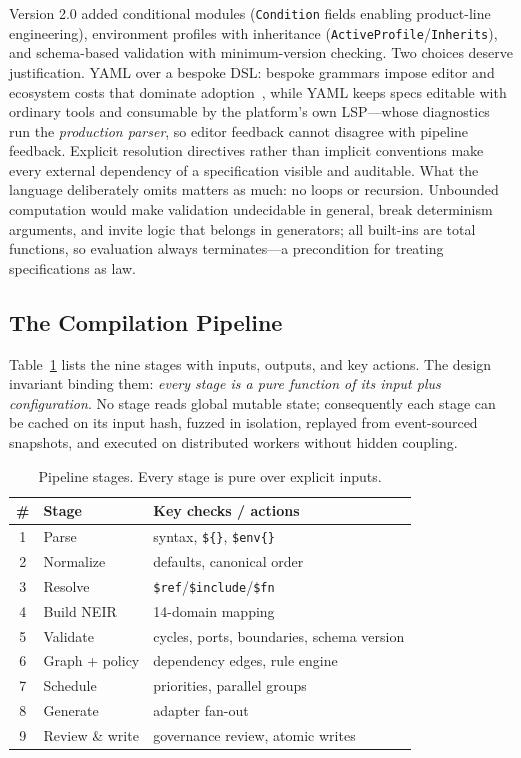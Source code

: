 \documentclass[sigconf,nonacm]{acmart}
\begin{document}
Version 2.0 added conditional modules (\texttt{Condition} fields enabling product-line engineering), environment profiles with inheritance (\texttt{ActiveProfile}/\texttt{Inherits}), and schema-based validation with minimum-version checking. Two choices deserve justification. YAML over a bespoke DSL: bespoke grammars impose editor and ecosystem costs that dominate adoption~\cite{mernik2005dsl}, while YAML keeps specs editable with ordinary tools and consumable by the platform's own LSP---whose diagnostics run the \emph{production parser}, so editor feedback cannot disagree with pipeline feedback. Explicit resolution directives rather than implicit conventions make every external dependency of a specification visible and auditable. What the language deliberately omits matters as much: no loops or recursion. Unbounded computation would make validation undecidable in general, break determinism arguments, and invite logic that belongs in generators; all built-ins are total functions, so evaluation always terminates---a precondition for treating specifications as law.

\subsection{The Compilation Pipeline}
\label{sec:pipeline}
Table~\ref{tab:stages} lists the nine stages with inputs, outputs, and key actions. The design invariant binding them: \emph{every stage is a pure function of its input plus configuration}. No stage reads global mutable state; consequently each stage can be cached on its input hash, fuzzed in isolation, replayed from event-sourced snapshots, and executed on distributed workers without hidden coupling.

\begin{table}[t]
\centering
\caption{Pipeline stages. Every stage is pure over explicit inputs.}
\label{tab:stages}
\small
\begin{tabular}{@{}clp{3.6cm}@{}}
\toprule
\# & Stage & Key checks / actions\\
\midrule
1 & Parse & syntax, \texttt{\$\{\}}, \texttt{\$env\{\}}\\
2 & Normalize & defaults, canonical order\\
3 & Resolve & \texttt{\$ref}/\texttt{\$include}/\texttt{\$fn}\\
4 & Build NEIR & 14-domain mapping\\
5 & Validate & cycles, ports, boundaries, schema version\\
6 & Graph + policy & dependency edges, rule engine\\
7 & Schedule & priorities, parallel groups\\
8 & Generate & adapter fan-out\\
9 & Review \& write & governance review, atomic writes\\
\bottomrule
\end{tabular}
\end{table}
\end{document}
